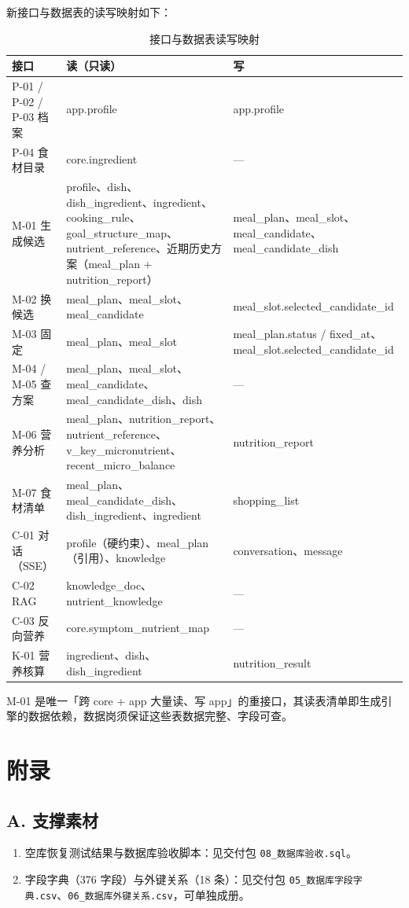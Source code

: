 \documentclass[12pt,a4paper]{ctexart}
\begin{document}
新接口与数据表的读写映射如下：

{\small\setlength{\tabcolsep}{4pt}\begin{xltabular}{\linewidth}{Q{3.0cm}LQ{6.4cm}}
\caption{接口与数据表读写映射} \\
\toprule
\textbf{接口} & \textbf{读（只读）} & \textbf{写} \\
\midrule
\endhead
P-01 / P-02 / P-03 档案 & app.profile & app.profile \\
P-04 食材目录 & core.ingredient & --- \\
M-01 生成候选 & profile、dish、dish\_ingredient、ingredient、cooking\_rule、goal\_structure\_map、nutrient\_reference、近期历史方案（meal\_plan + nutrition\_report） & meal\_plan、meal\_slot、meal\_candidate、meal\_candidate\_dish \\
M-02 换候选 & meal\_plan、meal\_slot、meal\_candidate & meal\_slot.selected\_candidate\_id \\
M-03 固定 & meal\_plan、meal\_slot & meal\_plan.status / fixed\_at、meal\_slot.selected\_candidate\_id \\
M-04 / M-05 查方案 & meal\_plan、meal\_slot、meal\_candidate、meal\_candidate\_dish、dish & --- \\
M-06 营养分析 & meal\_plan、nutrition\_report、nutrient\_reference、v\_key\_micronutrient、recent\_micro\_balance & nutrition\_report \\
M-07 食材清单 & meal\_plan、meal\_candidate\_dish、dish\_ingredient、ingredient & shopping\_list \\
C-01 对话（SSE） & profile（硬约束）、meal\_plan（引用）、knowledge & conversation、message \\
C-02 RAG & knowledge\_doc、nutrient\_knowledge & --- \\
C-03 反向营养 & core.symptom\_nutrient\_map & --- \\
K-01 营养核算 & ingredient、dish、dish\_ingredient & nutrition\_result \\
\bottomrule
\end{xltabular}}

M-01 是唯一「跨 core + app 大量读、写 app」的重接口，其读表清单即生成引擎的数据依赖，数据岗须保证这些表数据完整、字段可查。

\section*{附录}

\subsection*{A. 支撑素材}

\begin{enumerate}
\item 空库恢复测试结果与数据库验收脚本：见交付包 \texttt{08\_数据库验收.sql}。
\item 字段字典（376 字段）与外键关系（18 条）：见交付包 \texttt{05\_数据库字段字典.csv}、\texttt{06\_数据库外键关系.csv}，可单独成册。
\end{enumerate}
\end{document}
